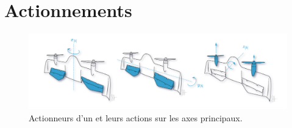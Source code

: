 


\section{Actionnements}

\begin{figure}[ht!]
    \centerline{
    \includegraphics[trim=0cm 0cm 0cm 0cm,clip,width=1\columnwidth]{figures/actionnement.png}}
    \caption{Actionneurs d'un  et leurs actions sur les axes principaux.}
    \label{fig:actionDarko}
\end{figure}

